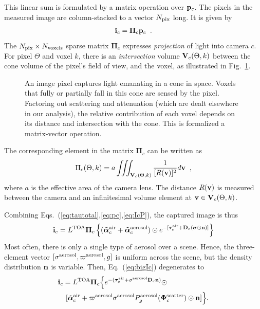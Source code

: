 \documentclass[10pt,twocolumn,letterpaper]{article}
\newcommand{\vect}[1]{\bm{#1}}
\newcommand{\yoavcomment}[1]{}
\renewcommand{\yoavcomment}[1]{#1} %
\begin{document}
This linear sum is formulated by a matrix operation over ${\bf p}_c$. The pixels in the measured image are column-stacked to a vector $N_{\rm pix}$ long. It is given by
\begin{equation}
 {\bf i}_c= {\vect{\Pi}}_c{\bf p}_c
  \;\;.
  \label{eq:IcP}
\end{equation}
The $N_{\rm pix}\times N_{\rm voxels}$ sparse matrix ${\vect{\Pi}}_c$
expresses {\em projection} of light into camera $c$.
For pixel $\Theta$ and voxel $k$, there is an {\em intersection} volume ${\bf V}_c(\Theta,k)$ between the cone volume of the pixel's field of view, and the voxel, as illustrated in Fig.~\ref{fig:projection}.
\begin{figure}
  \centering
  \yoavcomment{\def\svgwidth{\columnwidth}}
  \caption{\small
  An image pixel captures light emanating in a cone in space. Voxels that fully or
  partially fall in this cone are sensed by the pixel. Factoring out
  scattering and attenuation (which are dealt elsewhere in our analysis), the
  relative contribution of each voxel depends on its distance and intersection with the cone. This is formalized a matrix-vector operation.}
  \label{fig:projection}
\end{figure}
The corresponding element in the matrix ${\vect{\Pi}}_c$ can be written as
\begin{equation}
 \Pi_c(\Theta,k)=
     a
     \iiint_{{\bf V}_c(\Theta,k)}
     \frac{1}{[R({\bf v})]^2} d{\bf v}
  \;\;,
  \label{eq:Pc}
\end{equation}
where $a$ is the effective area of the camera lens.
The distance $R({\bf v})$ is measured between the camera and an infinitesimal volume element at ${\bf v}\in {\bf V}_c(\Theta,k)$.

Combining Eqs.~(\ref{eq:tautotal},\ref{eq:pc},\ref{eq:IcP}), the captured image is thus
\begin{align}
 {\bf i}_c= L^{\rm TOA}
    {\vect{\Pi}}_c
          \left\{
          (\tilde{\vect{\alpha}}^{\rm air}_c + \tilde{\vect{\alpha}}^{\rm aerosol}_c)
           \odot
            e^{-[\vect{\tau}_c^{\rm air}
               + {\bf D}_c (\vect{\sigma} \odot {\bf n})]}
           \right\}
  \label{eq:bigIc}
\end{align}
Most often, there is only a single type of aerosol over a scene. Hence, the three-element
vector $[{\sigma}^{\rm aerosol},\varpi^{\rm aerosol},g]$ is uniform across the scene, but the density distribution ${\bf n}$ is variable. Then, Eq.~(\ref{eq:bigIc}) degenerates to
\begin{align}
 {\bf i}_c= L^{\rm TOA}
    {\vect{\Pi}}_c
          \Big\{
            e^{-(\vect{\tau}_c^{\rm air}
                  + {\sigma}^{\rm aerosol} {\bf D}_c {\bf n})
              }\odot
  \;\;\;\;\;\;\;\;\;\;\;\;\;\;\;\;\;\;\;\;\;
     \nonumber \\
           [\tilde{\vect{\alpha}}^{\rm air}_c + %
           \varpi^{\rm aerosol}\sigma^{\rm aerosol}
           P^{\rm aerosol}_g(\vect{\Phi}^{\rm scatter}_c)
           \odot{\bf n}
           ]
           \Big\}
           .
  \label{eq:bigIA}
\end{align}
\end{document}

